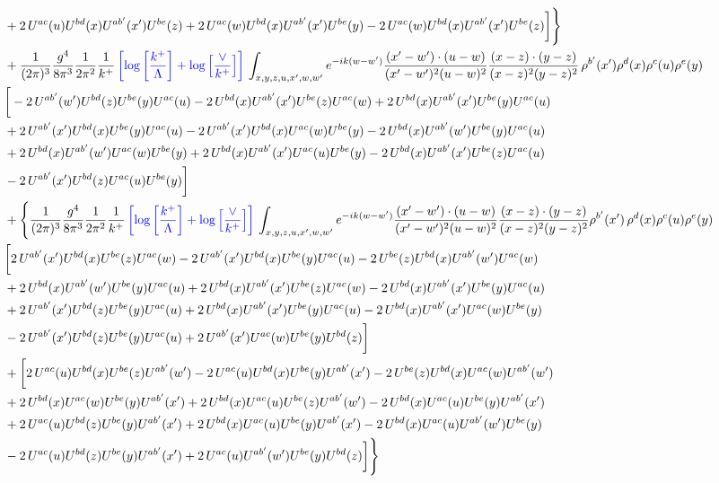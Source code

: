 \documentclass[aps,prd,amsmath,amssymb,nofootinbib]{revtex4-2}
\numberwithin{equation}{section}
\begin{document}
\begin{align}
    & +2\, U^{ac}(u)U^{bd}(x)U^{ab'}(x')U^{be}(z) + 2\,U^{ac}(w)U^{bd}(x)U^{ab'}(x')U^{be}(y)- 2\,U^{ac}(w)U^{bd}(x)U^{ab'}(x')U^{be}(z)\bigg]\Bigg\}\notag \\ & + \frac{1}{(2\pi)^{3}}\frac{g^{4}}{8\pi^{3}}\frac{1}{2\pi^{2}} \frac{1}{k^{+}}\,{\color{blue}\left[\log{\left[\frac{k^{+}}{\Lambda}\right]}+\log{\left[\frac{\vee}{k^{+}}\right]}\right]}\,\int_{x,y,z,u,x^{\prime},w,w^{\prime}}e^{-ik(w-w^{\prime})}\frac{(x^{\prime}-w^{\prime})\cdot (u-w)}{(x^{\prime}-w^{\prime})^{2} (u-w)^{2}} \frac{(x-z)\cdot (y-z)}{(x-z)^{2}(y-z)^{2}}\,\rho^{b'}(x^{\prime})\rho^{d}(x)\rho^{c}(u)\rho^{e}(y)\notag \\ & \bigg[-2\,U^{ab'}(w')U^{bd}(z)U^{be}(y)U^{ac}(u) - 2\,U^{bd}(x)U^{ab'}(x^{\prime})U^{be}(z)U^{ac}(w)+ 2\,U^{bd}(x)U^{ab'}(x')U^{be}(y)U^{ac}(u)\notag \\ & + 2\, U^{ab'}(x')U^{bd}(x)U^{be}(y)U^{ac}(u) - 2\,U^{ab'}(x')U^{bd}(x)U^{ac}(w)U^{be}(y) - 2\,U^{bd}(x)U^{ab'}(w')U^{be}(y)U^{ac}(u)\notag \\ &  + 2\, U^{bd}(x)U^{ab'}(w')U^{ac}(w)U^{be}(y) +2\, U^{bd}(x)U^{ab'}(x')U^{ac}(u)U^{be}(y) - 2\,U^{bd}(x)U^{ab'}(x')U^{be}(z)U^{ac}(u)\notag \\ &  - 2\, U^{ab'}(x')U^{bd}(z)U^{ac}(u)U^{be}(y)\bigg]\notag \\ & + \Bigg\{\frac{1}{(2\pi)^{3}}\frac{g^{4}}{8\pi^{3}}\frac{1}{2\pi^{2}} \frac{1}{k^{+}}\,{\color{blue}\left[\log{\left[\frac{k^{+}}{\Lambda}\right]}+\log{\left[\frac{\vee}{k^{+}}\right]}\right]}\,\int_{x,y,z,u,x^{\prime},w,w^{\prime}}e^{-ik(w-w^{\prime})}\frac{(x^{\prime}-w^{\prime})\cdot (u-w)}{(x^{\prime}-w^{\prime})^{2} (u-w)^{2}} \frac{(x-z)\cdot (y-z)}{(x-z)^{2}(y-z)^{2}}\rho^{b'}(x^{\prime})\,\rho^{d}(x)\rho^{c}(u)\rho^{e}(y)\notag \\ & \bigg[2\,U^{ab'}(x')U^{bd}(x)U^{be}(z)U^{ac}(w)-2\,U^{ab'}(x')U^{bd}(x)U^{be}(y)U^{ac}(u)-2\,U^{be}(z)U^{bd}(x)U^{ab'}(w')U^{ac}(w)\notag \\ &+2\,U^{bd}(x)U^{ab'}(w')U^{be}(y)U^{ac}(u) +2\,U^{bd}(x)U^{ab'}(x')U^{be}(z)U^{ac}(w) - 2\,U^{bd}(x)U^{ab'}(x')U^{be}(y)U^{ac}(u)\notag \\ & +2\,U^{ab'}(x')U^{bd}(z)U^{be}(y)U^{ac}(u)+2\,U^{bd}(x)U^{ab'}(x')U^{be}(y)U^{ac}(u) -2\, U^{bd}(x)U^{ab'}(x')U^{ac}(w)U^{be}(y)\notag \\ & -2\,  U^{ab'}(x')U^{bd}(z)U^{be}(y)U^{ac}(u) + 2\, U^{ab'}(x')U^{ac}(w)U^{be}(y)U^{bd}(z)\bigg]\notag \\ & +\bigg[2\,U^{ac}(u)U^{bd}(x)U^{be}(z)U^{ab'}(w') -2\,U^{ac}(u)U^{bd}(x)U^{be}(y)U^{ab'}(x')-2\,U^{be}(z)U^{bd}(x)U^{ac}(w)U^{ab'}(w')\notag \\ & +2\,U^{bd}(x)U^{ac}(w)U^{be}(y)U^{ab'}(x') +2\,U^{bd}(x)U^{ac}(u)U^{be}(z)U^{ab'}(w') -2\,U^{bd}(x)U^{ac}(u)U^{be}(y)U^{ab'}(x')\notag \\  & + 2\,U^{ac}(u)U^{bd}(z)U^{be}(y)U^{ab'}(x')+ 2\,U^{bd}(x)U^{ac}(u)U^{be}(y)U^{ab'}(x') -2\, U^{bd}(x)U^{ac}(u)U^{ab'}(w')U^{be}(y)\notag \\ & 
     -2\, U^{ac}(u)U^{bd}(z)U^{be}(y)U^{ab'}(x')+2\, U^{ac}(u)U^{ab'}(w')U^{be}(y)U^{bd}(z)\bigg]\Bigg\}
\end{align}
\end{document}
